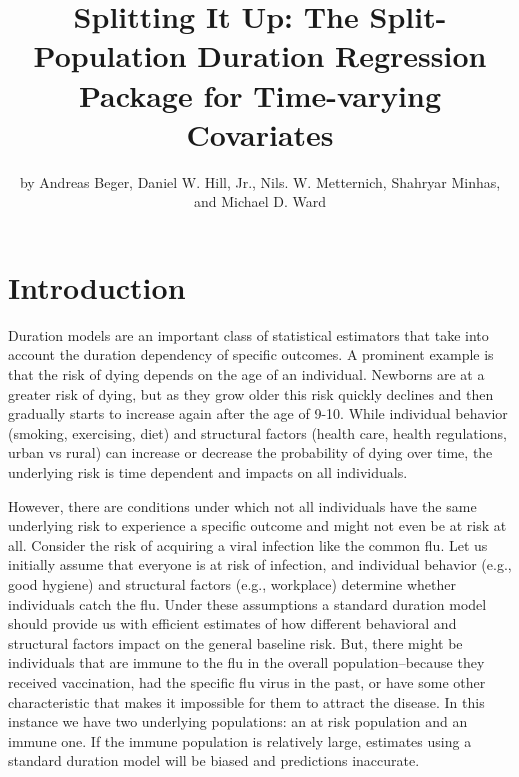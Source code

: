 \title{Splitting It Up: The  Split-Population Duration
Regression Package for Time-varying Covariates}
\author{by Andreas Beger, Daniel W. Hill, Jr., Nils. W. Metternich, Shahryar Minhas, and Michael D. Ward}

\maketitle


\section{Introduction}

Duration models are an important class of statistical estimators that
take into account the duration dependency of specific outcomes. A
prominent example is that the risk of dying depends on the age of an
individual. Newborns are at a greater risk of dying, but as they grow
older this risk quickly declines and then gradually starts to increase
again after the age of 9-10. While individual behavior (smoking,
exercising, diet) and structural factors (health care, health
regulations, urban vs rural) can increase or decrease the probability of
dying over time, the underlying risk is time dependent and impacts on
all individuals.

However, there are conditions under which not all individuals have the
same underlying risk to experience a specific outcome and might not even
be at risk at all. Consider the risk of acquiring a viral infection like
the common flu. Let us initially assume that everyone is at risk of
infection, and individual behavior (e.g., good hygiene) and structural
factors (e.g., workplace) determine whether individuals catch the flu.
Under these assumptions a standard duration model should provide us with
efficient estimates of how different behavioral and structural factors
impact on the general baseline risk. But, there might be individuals
that are immune to the flu in the overall population--because they
received vaccination, had the specific flu virus in the past, or have
some other characteristic that makes it impossible for them to attract
the disease. In this instance we have two underlying populations: an at
risk population and an immune one. If the immune population is
relatively large, estimates using a standard duration model will be
biased and predictions inaccurate. 

